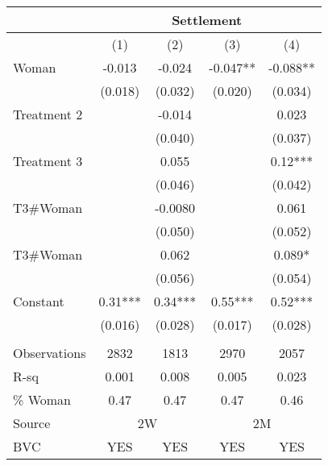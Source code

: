 \begin{tabular}{lcccc}
\toprule
      & \multicolumn{4}{c}{Settlement} \\
\midrule
\midrule
      & (1)   & (2)   & (3)   & (4) \\
\midrule
\midrule
Woman  & -0.013 & -0.024 & -0.047** & -0.088** \\
      & (0.018) & (0.032) & (0.020) & (0.034) \\
Treatment 2 &       & -0.014 &       & 0.023 \\
      &       & (0.040) &       & (0.037) \\
Treatment 3 &       & 0.055 &       & 0.12*** \\
      &       & (0.046) &       & (0.042) \\
T3\#Woman &       & -0.0080 &       & 0.061 \\
      &       & (0.050) &       & (0.052) \\
T3\#Woman &       & 0.062 &       & 0.089* \\
      &       & (0.056) &       & (0.054) \\
Constant & 0.31*** & 0.34*** & 0.55*** & 0.52*** \\
      & (0.016) & (0.028) & (0.017) & (0.028) \\
      &       &       &       &  \\
\midrule
Observations & 2832  & 1813  & 2970  & 2057 \\
R-sq  & 0.001 & 0.008 & 0.005 & 0.023 \\
\% Woman & 0.47  & 0.47  & 0.47  & 0.46 \\
Source & \multicolumn{2}{c}{2W} & \multicolumn{2}{c}{2M} \\
BVC   & YES   & YES   & YES   & YES \\
\bottomrule
\bottomrule
\end{tabular}%
